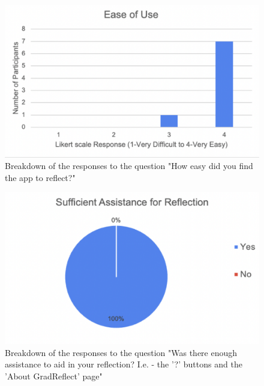 \documentclass{l4proj}
\begin{document}
\begin{appendices}
\begin{figure}[H]
    \begin{centering}
    \includegraphics[scale=0.5]{images/userSurvey5.pdf}
    \caption{Breakdown of the responses to the question "How easy did you find the app to reflect?"}
    \label{fig: userSurvey5}
    \end{centering}
\end{figure}

\begin{figure}[H]
    \begin{centering}
    \includegraphics[scale=0.5]{images/userSurvey6.pdf}
    \caption{Breakdown of the responses to the question "Was there enough assistance to aid in your reflection? I.e. - the '?' buttons and the 'About GradReflect' page"}
    \label{fig: userSurvey6}
    \end{centering}
\end{figure}


\end{appendices}
\end{document}
